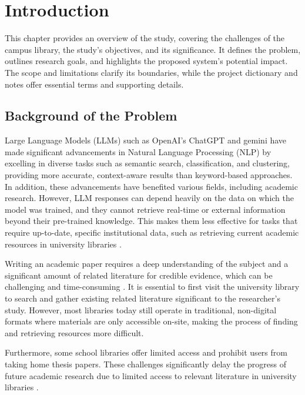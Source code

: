 \chapter{Introduction}
\begin{refsection}

This chapter provides an overview of the study, covering the challenges of the campus library, the study’s objectives, and its significance. It defines the problem, outlines research goals, and highlights the proposed system’s potential impact. The scope and limitations clarify its boundaries, while the project dictionary and notes offer essential terms and supporting details. 

\section{Background of the Problem}

Large Language Models (LLMs) such as OpenAI's ChatGPT \cite{achiam2023gpt}  and gemini \cite{lee2025gemini} have made significant advancements in Natural Language Processing (NLP) by excelling in diverse tasks such as semantic search, classification, and clustering, providing more accurate, context-aware results than keyword-based approaches.
\cite{nijkamp2022codegen,chen2021evaluating} In addition, these advancements have benefited various fields, including academic research. However, LLM responses can depend heavily on the data on which the model was trained, and they cannot retrieve real-time or external information beyond their pre-trained knowledge. This makes them less effective for tasks that require up-to-date, specific institutional data, such as retrieving current academic resources in university libraries \cite{liu2024information}.

\bigbreak
Writing an academic paper requires a deep understanding of the subject and a significant amount of related literature for credible evidence, which can be challenging and time-consuming \cite{khalifa2024using}. It is essential to first visit the university library to search and gather existing related literature significant to the researcher’s study.  However, most libraries today still operate in traditional, non-digital formats where materials are only accessible on-site, making the process of finding and retrieving resources more difficult. 

Furthermore, some school libraries offer limited access and prohibit users from taking home thesis papers. These challenges significantly delay the progress of future academic research due to limited access to relevant literature in university libraries \cite{prajapat2022comparative}. 


\end{refsection}
